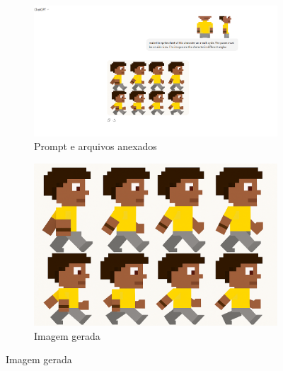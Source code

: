 \begin{figure}[htbp]
    \centering
    \caption{\small Processo da utilização 5 do ChatGPTem julho/2025}
    \label{fig:chatGPT6}

    \begin{subfigure}{1\linewidth}
        \includegraphics[width=1\linewidth]{figs/chatGPT/walking_cycle/side_view/tela3.PNG}
        \caption{\small Prompt e arquivos anexados}
        \label{fig:chatGPT6a}
    \end{subfigure}

    \begin{subfigure}{0.5\linewidth}
        \includegraphics[width=1\linewidth]{figs/chatGPT/walking_cycle/side_view/walking cycle 2.png}
        \caption{\small Imagem gerada}
        \label{fig:chatGPT6b}
    \end{subfigure}
\end{figure}